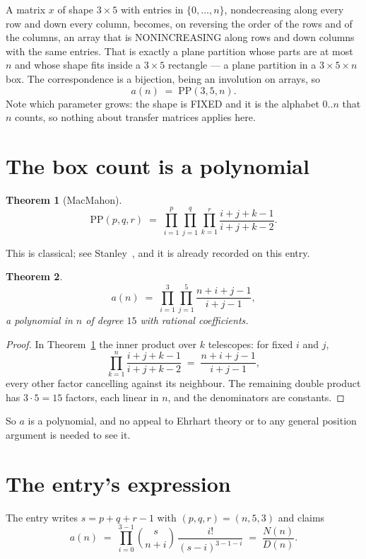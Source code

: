 \documentclass[11pt,a4paper]{article}
\theoremstyle{plain}
\newtheorem{theorem}{Theorem}
\theoremstyle{definition}
\begin{document}
A matrix $x$ of shape $3\times5$ with entries in $\{0,\dots,n\}$, nondecreasing along
every row and down every column, becomes, on reversing the order of the rows and of the
columns, an array that is NONINCREASING along rows and down columns with the same entries. That
is exactly a plane partition whose parts are at most $n$ and whose shape fits inside a
$3\times5$ rectangle --- a plane partition in a $3\times5\times n$ box. The
correspondence is a bijection, being an involution on arrays, so
\[
a(n)\;=\;\mathrm{PP}(3,5,n).
\]
Note which parameter grows: the shape is FIXED and it is the alphabet $0..n$ that $n$ counts,
so nothing about transfer matrices applies here.

\section{The box count is a polynomial}

\begin{theorem}[MacMahon]\label{thm:mm}
\[
\mathrm{PP}(p,q,r)\;=\;\prod_{i=1}^{p}\prod_{j=1}^{q}\prod_{k=1}^{r}
\frac{i+j+k-1}{i+j+k-2} .
\]
\end{theorem}

This is classical; see Stanley~\cite{stanley}, and it is already recorded on this entry.

\begin{theorem}\label{thm:poly}
\[
a(n)\;=\;\prod_{i=1}^{3}\prod_{j=1}^{5}\frac{n+i+j-1}{i+j-1},
\]
a polynomial in $n$ of degree $15$ with rational coefficients.
\end{theorem}

\begin{proof}
In Theorem~\ref{thm:mm} the inner product over $k$ telescopes: for fixed $i$ and $j$,
\[
\prod_{k=1}^{n}\frac{i+j+k-1}{i+j+k-2}\;=\;\frac{n+i+j-1}{i+j-1} ,
\]
every other factor cancelling against its neighbour. The remaining double product has
$3\cdot5=15$ factors, each linear in $n$, and the denominators are constants.
\end{proof}

So $a$ is a polynomial, and no appeal to Ehrhart theory or to any general position argument is
needed to see it.

\section{The entry's expression}

The entry writes $s=p+q+r-1$ with $(p,q,r)=(n,5,3)$ and claims
\[
a(n)\;=\;\prod_{i=0}^{3-1}\binom{s}{n+i}\,\frac{i!}{(s-i)^{3-1-i}}\;=\;
\frac{N(n)}{D(n)} .
\]
\end{document}
